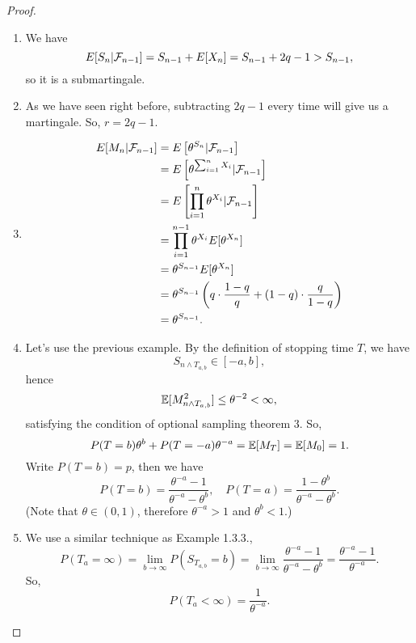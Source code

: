 \documentclass[a4paper]{article}\usepackage{amsmath,amssymb,amsthm,tikz,hyperref,mathtools,mathrsfs}
\begin{document}
\begin{proof}
  \begin{enumerate}
    \item We have
    \[
      E[S_n | \mathcal{F}_{n-1}] = S_{n-1} + E[X_n] = S_{n-1} + 2q-1 > S_{n-1},
    \]
    so it is a submartingale.
    \item As we have seen right before, subtracting $2q-1$ every time will give us a martingale. 
    So, $r = 2q-1$.
    \item 
    \begin{align*}
      E[M_n | \mathcal{F}_{n-1}] &= E\left[\theta^{S_n} | \mathcal{F}_{n-1}\right]
      \\
      {} &= E \left[\theta^{\sum_{i=1}^n X_i} | \mathcal{F}_{n-1}\right]
      \\
      {} &= E \left[ \prod_{i=1}^n \theta^{X_i} | \mathcal{F}_{n-1} \right]
      \\
      {} &= \prod_{i=1}^{n-1} \theta^{X_i} E[\theta^{X_n}]
      \\
      {} &= \theta^{S_{n-1}} E[\theta^{X_n}]
      \\
      {} &= \theta^{S_{n-1}} \left( q \cdot \frac{1-q}{q} + (1-q) \cdot \frac{q}{1-q} \right)
      \\
      {} &= \theta^{S_{n-1}}.
    \end{align*}
    \item Let's use the previous example. By the definition of stopping time $T$, we have
    \[
      S_{n \wedge T_{a,b}} \in [-a, b],
    \]
    hence
    \[
      \operatorname*{\mathbb{E}}[M_{n \wedge T_{a,b}}^2] \le \theta^{-2} < \infty,
    \]
    satisfying the condition of optional sampling theorem 3.
    So,
    \[
      P(T=b) \theta^b + P(T=-a) \theta^{-a} = \operatorname*{\mathbb{E}}[M_T] = \operatorname*{\mathbb{E}}[M_0] = 1.
    \]
    Write $P(T=b) = p$, then we have
    \[
      P(T=b) = \frac{\theta^{-a} - 1}{\theta^{-a} - \theta^b}, \quad P(T=a) = \frac{1 - \theta^b}{\theta^{-a} - \theta^b}.
    \]
    (Note that $\theta \in (0, 1)$, therefore $\theta^{-a} > 1$ and $\theta^b < 1$.)
    \item We use a similar technique as Example 1.3.3., 
    \[
      P(T_a = \infty) = \lim_{b \to \infty} P(S_{T_{a,b}} = b) = \lim_{b \to \infty} \frac{\theta^{-a} - 1}{\theta^{-a} - \theta^b} = \frac{\theta^{-a} - 1}{\theta^{-a}}.
    \]
    So,
    \[
      P(T_a < \infty) = \frac{1}{\theta^{-a}}.
    \]
  \end{enumerate}
\end{proof}
\end{document}
